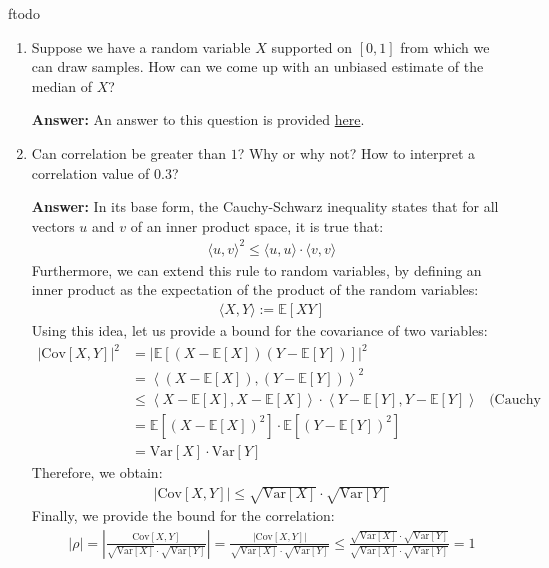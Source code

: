 ƒtodo\documentclass{article}
\newenvironment{QandA}{\begin{enumerate}[label=\arabic*.]}{\end{enumerate}}
\newenvironment{answer}{\par\normalfont \textbf{Answer:}}{}
\newcommand{\Exp}[1]{\mathbb{E}\left[ #1 \right]}
\newcommand{\Vari}[1]{\text{Var}\left[ #1 \right]}
\newcommand{\Cov}[1]{\text{Cov}\left[ #1 \right]}
\begin{document}
\begin{QandA}
    \item Suppose we have a random variable $X$  supported on  $[0,1]$ from which we can draw samples. How can we come up with an unbiased estimate of the median of $X$?
    \begin{answer}
        An answer to this question is provided \href{https://stats.stackexchange.com/questions/36134/an-unbiased-estimate-of-the-median}{here}.
    \end{answer}

    \item Can correlation be greater than $1$? Why or why not? How to interpret a correlation value of $0.3$?
    \begin{answer}
        In its base form, the Cauchy-Schwarz inequality states that for all vectors $u$ and $v$ of an inner product space, it is true that:
        \begin{align*}
            \langle u, v\rangle^2 \le \langle u, u \rangle \cdot \langle v, v \rangle
        \end{align*}
        Furthermore, we can extend this rule to random variables, by defining an inner product as the expectation of the product of the random variables:
        \begin{align*}
            \langle X, Y \rangle := \Exp{XY}
        \end{align*}
        Using this idea, let us provide a bound for the covariance of two variables:
        \begin{align*}
            \left\vert \Cov{X, Y} \right\vert^2 &= \left \vert \Exp{(X - \Exp{X}) (Y - \Exp{Y})} \right \vert^2 \\
            &= \left \langle (X - \Exp{X}), (Y - \Exp{Y}) \right \rangle^2 \\
            &\le  \left \langle X - \Exp{X}, X - \Exp{X} \right \rangle \cdot \left \langle Y - \Exp{Y}, Y - \Exp{Y} \right \rangle &\text{(Cauchy Schwarz)}\\
            &= \Exp{(X - \Exp{X})^2} \cdot \Exp{(Y - \Exp{Y})^2} \\
            &= \Vari{X} \cdot \Vari{Y}
        \end{align*}
        Therefore, we obtain:
        \begin{align*}
            \left\vert \Cov{X, Y} \right\vert \le \sqrt{\Vari{X}} \cdot \sqrt{\Vari{Y}}
        \end{align*}
        Finally, we provide the bound for the correlation:
        \begin{align*}
            \vert \rho \vert = \left \vert \frac{\Cov{X, Y}}{\sqrt{\Vari{X}} \cdot \sqrt{\Vari{Y}}} \right \vert =  \frac{\left \vert \Cov{X, Y}\right \vert}{\sqrt{\Vari{X}} \cdot \sqrt{\Vari{Y}}} \le \frac{\sqrt{\Vari{X}} \cdot \sqrt{\Vari{Y}}}{\sqrt{\Vari{X}} \cdot \sqrt{\Vari{Y}}} = 1

\end{align*}
\end{answer}
\end{QandA}
\end{document}
